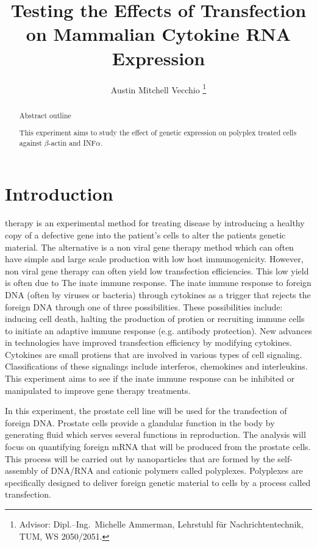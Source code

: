 \documentclass[journal, a4paper]{IEEEtran}
\begin{document}
\title{Testing the Effects of Transfection on Mammalian Cytokine RNA Expression}
\author{Austin Mitchell Vecchio
\thanks{Advisor: Dipl.--Ing.~Michelle Ammerman, Lehrstuhl f\"ur Nachrichtentechnik, TUM, WS 2050/2051.}}
\maketitle

\begin{abstract}
  Abstract outline

  This experiment aims to study the effect of genetic expression on polyplex treated cells against $\beta$-actin and INF$\alpha$.

\end{abstract}

\section{Introduction}
   therapy is an experimental method for treating disease by introducing a healthy copy of a
  defective gene into the patient's cells to alter the patients genetic material.
  The alternative is a non viral gene therapy method which can often have simple and large scale production
  with low host immunogenicity. However, non viral gene therapy can often yield low transfection efficiencies.
  This low yield is often due to The inate immune response. The inate immune response to foreign DNA (often by viruses or bacteria) through cytokines
  as a trigger that rejects the foreign DNA through one of three possibilities. These possibilities include: inducing
  cell death, halting the production of protien or recruiting immune cells to initiate an adaptive immune response (e.g. antibody protection).
  New advances in technologies have improved transfection efficiency by modifying cytokines. Cytokines
  are small protiens that are involved in various types of cell signaling. Classifications of these signalings
  include interferos, chemokines and interleukins.
  This experiment aims to see if the inate immune response can be inhibited or manipulated to improve gene therapy treatments.

  In this experiment, the prostate cell line will be used for the transfection of foreign DNA. Prostate cells provide a glandular function
  in the body by generating fluid which serves several functions in reproduction. The analysis will focus on quantifying foreign mRNA that will be
  produced from the prostate cells. This process will be carried out by nanoparticles that are formed by the self-assembly of DNA/RNA and cationic polymers
  called polyplexes. Polyplexes are specifically designed to deliver foreign genetic material to cells by a process called transfection.
  
\end{document}
